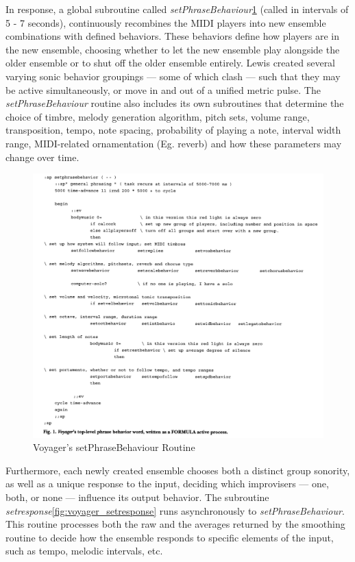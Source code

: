 \documentclass[../main.tex]{subfiles}
\begin{document}
In response, a global subroutine called \textit{setPhraseBehaviour}\ref{fig:voyager_setphrasebehaviour} (called in intervals of 5 - 7 seconds), continuously recombines the MIDI players into new ensemble combinations with defined behaviors. These behaviors define how players are in the new ensemble, choosing whether to let the new ensemble play alongside the older ensemble or to shut off the older ensemble entirely. Lewis created several varying sonic behavior groupings — some of which clash — such that they may be active simultaneously, or move in and out of a unified metric pulse. The \textit{setPhraseBehaviour} routine also includes its own subroutines that determine the choice of timbre, melody generation algorithm, pitch sets, volume range, transposition, tempo, note spacing, probability of playing a note, interval width range, MIDI-related ornamentation (Eg. reverb) and how these parameters may change over time. 

\begin{figure}[htbp]
    \includegraphics[width=1\textwidth,]{imgs/voyager_setphrasebehaviour.png}
    \caption{Voyager's setPhraseBehaviour Routine}
    \label{fig:voyager_setphrasebehaviour}
\end{figure}

Furthermore, each newly created ensemble chooses both a distinct group sonority, as well as a unique response to the input, deciding which improvisers — one, both, or none — influence its output behavior. The subroutine \textit{setresponse}\ref{fig:voyager_setresponse} runs asynchronously to \textit{setPhraseBehaviour}. This routine processes both the raw and the averages returned by the smoothing routine to decide how the ensemble responds to specific elements of the input, such as tempo, melodic intervals, etc. 
\end{document}
